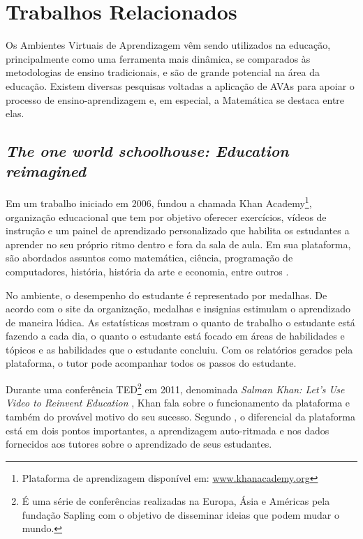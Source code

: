 \section{Trabalhos Relacionados}
\label{cap:trabalhos-relacionados}

Os Ambientes Virtuais de Aprendizagem vêm sendo utilizados na educação, principalmente como uma ferramenta mais dinâmica, se comparados \`as metodologias de ensino tradicionais, e são de 
grande potencial na área da educação. Existem diversas pesquisas voltadas a aplicação de AVAs para apoiar o processo de ensino-aprendizagem e, em especial, a Matemática se destaca entre elas.

\subsection{\textit{The one world schoolhouse: Education reimagined}}
Em um trabalho iniciado em 2006,  fundou a chamada Khan Academy\footnote{Plataforma de aprendizagem disponível em: \url{www.khanacademy.org}}, organização educacional que tem 
por objetivo oferecer exercícios, vídeos de instrução e um painel de aprendizado personalizado que habilita os estudantes a aprender no seu próprio ritmo dentro e fora da sala de aula. Em sua 
plataforma, são abordados assuntos como matemática, ciência, programação de computadores, história, história da arte e economia, entre outros \cite{khan2012one}.

No ambiente, o desempenho do estudante é representado por medalhas. De acordo com o site da organização, medalhas e insignias estimulam o aprendizado de maneira lúdica. As estatísticas mostram o 
quanto de trabalho o estudante está fazendo a cada dia, o quanto o estudante está focado em áreas de habilidades e tópicos e as habilidades que o estudante concluiu. Com os relatórios gerados pela 
plataforma, o tutor pode acompanhar todos os passos do estudante.

Durante uma conferência TED\footnote{É uma série de conferências realizadas na Europa, Ásia e Américas pela fundação Sapling com o objetivo de disseminar ideias que podem mudar o mundo.} em 2011, 
denominada \textit{Salman Khan: Let's Use Video to Reinvent Education} \cite{tedtalk2011reinvend}, Khan fala sobre o funcionamento da plataforma e também do provável motivo do seu sucesso. Segundo 
, o diferencial da plataforma está em dois pontos importantes, a aprendizagem auto-ritmada e nos dados fornecidos aos tutores sobre o aprendizado de seus estudantes. 

